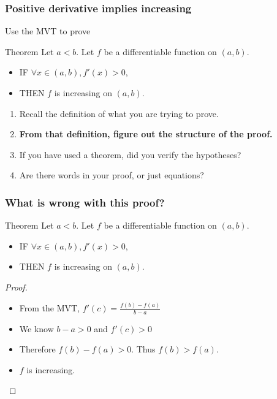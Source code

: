 \begin{frame}[t]
	\frametitle{Positive derivative implies increasing}

	Use the MVT to prove

	\begin{block}{Theorem}
		Let $a < b$. Let $f$ be a differentiable function on $(a,b)$.
		\begin{itemize}
			\item IF $\forall x \in (a,b), f'(x) >0$,

			\item THEN $f$ is increasing on $(a,b)$.
		\end{itemize}
	\end{block}


	\begin{enumerate}
		\item Recall the definition of what you are trying to prove.

		\item {\bfseries From that definition, figure out the structure of the proof.}

		\item If you have used a theorem, did you verify the hypotheses?

		\item Are there words in your proof, or just equations?
	\end{enumerate}
\end{frame}

\begin{frame}[t]
	\frametitle{What is wrong with this proof?}

	\begin{block}{Theorem}
		Let $a < b$. Let $f$ be a differentiable function on $(a,b)$.
		\begin{itemize}
			\item IF $\forall x \in (a,b), f'(x) >0$,

			\item THEN $f$ is increasing on $(a,b)$.
		\end{itemize}
	\end{block}

	\begin{proof}
		\begin{itemize}
			\item From the MVT, $\displaystyle f'(c) = \frac{f(b) - f(a)}{b-a}$

			\item We know $\displaystyle b-a>0$ and $\displaystyle f'(c)>0$

			\item Therefore $\displaystyle f(b) - f(a)>0$. \quad Thus
				$\displaystyle f(b) > f(a)$.

			\item $f$ is increasing.
		\end{itemize}
	\end{proof}
\end{frame}

